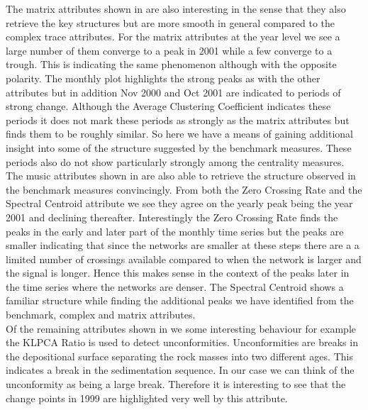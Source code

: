 The matrix attributes shown in  are also interesting in the sense that they also retrieve the key structures but are more smooth in general compared to the complex trace attributes. For the matrix attributes at the year level we see a large number of them converge to a peak in 2001 while a few converge to a trough. This is indicating the same phenomenon although with the opposite polarity. The monthly plot highlights the strong peaks as with the other attributes but in addition Nov 2000 and Oct 2001 are indicated to periods of strong change. Although the Average Clustering Coefficient indicates these periods it does not mark these periods as strongly as the matrix attributes but finds them to be roughly similar. So here we have a means of gaining additional insight into some of the structure suggested by the benchmark measures. These periods also do not show particularly strongly among the centrality measures.\\

The music attributes shown in  are also able to retrieve the structure observed in the benchmark measures convincingly. From both the Zero Crossing Rate and the Spectral Centroid attribute we see they agree on the yearly peak being the year 2001 and declining thereafter. Interestingly the Zero Crossing Rate finds the peaks in the early and later part of the monthly time series but the peaks are smaller indicating that since the networks are smaller at these steps there are a a limited number of crossings available compared to when the network is larger and the signal is longer. Hence this makes sense in the context of the peaks later in the time series where the networks are denser. The Spectral Centroid shows a familiar structure while finding the additional peaks we have identified from the benchmark, complex and matrix attributes. \\

Of the remaining attributes shown in  we some interesting behaviour for example the KLPCA Ratio is used to detect unconformities. Unconformities are breaks in the depositional surface separating the rock masses into two different ages. This indicates a break in the sedimentation sequence. In our case we can think of the unconformity as being a large break. Therefore it is interesting to see that the change points in 1999 are highlighted very well by this attribute.  \\

